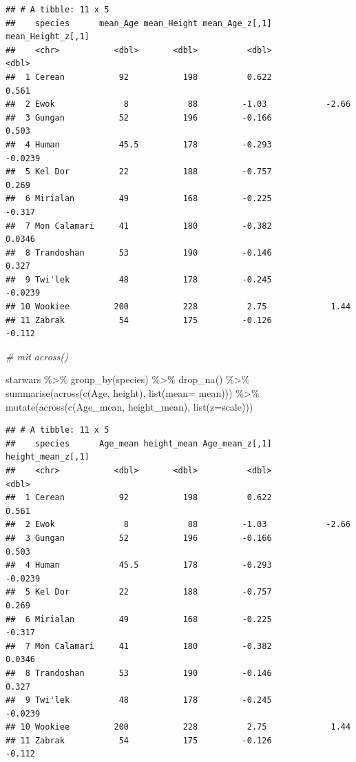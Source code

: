 \documentclass[
]{book}
\newenvironment{Shaded}{\begin{snugshade}}{\end{snugshade}}
\newcommand{\AttributeTok}[1]{\textcolor[rgb]{0.77,0.63,0.00}{#1}}
\newcommand{\CommentTok}[1]{\textcolor[rgb]{0.56,0.35,0.01}{\textit{#1}}}
\newcommand{\FunctionTok}[1]{\textcolor[rgb]{0.00,0.00,0.00}{#1}}
\newcommand{\NormalTok}[1]{#1}
\newcommand{\SpecialCharTok}[1]{\textcolor[rgb]{0.00,0.00,0.00}{#1}}
\theoremstyle{definition}
\theoremstyle{definition}
\theoremstyle{definition}
\theoremstyle{definition}
\theoremstyle{remark}
\begin{document}
\begin{verbatim}
## # A tibble: 11 x 5
##    species      mean_Age mean_Height mean_Age_z[,1] mean_Height_z[,1]
##    <chr>           <dbl>       <dbl>          <dbl>             <dbl>
##  1 Cerean           92           198          0.622            0.561 
##  2 Ewok              8            88         -1.03            -2.66  
##  3 Gungan           52           196         -0.166            0.503 
##  4 Human            45.5         178         -0.293           -0.0239
##  5 Kel Dor          22           188         -0.757            0.269 
##  6 Mirialan         49           168         -0.225           -0.317 
##  7 Mon Calamari     41           180         -0.382            0.0346
##  8 Trandoshan       53           190         -0.146            0.327 
##  9 Twi'lek          48           178         -0.245           -0.0239
## 10 Wookiee         200           228          2.75             1.44  
## 11 Zabrak           54           175         -0.126           -0.112
\end{verbatim}

\begin{Shaded}
\begin{Highlighting}[]
\CommentTok{\# mit across()}

\NormalTok{starwars }\SpecialCharTok{\%\textgreater{}\%} \FunctionTok{group\_by}\NormalTok{(species) }\SpecialCharTok{\%\textgreater{}\%}
  \FunctionTok{drop\_na}\NormalTok{() }\SpecialCharTok{\%\textgreater{}\%}
  \FunctionTok{summarise}\NormalTok{(}\FunctionTok{across}\NormalTok{(}\FunctionTok{c}\NormalTok{(Age, height), }\FunctionTok{list}\NormalTok{(}\AttributeTok{mean=}\NormalTok{ mean))) }\SpecialCharTok{\%\textgreater{}\%}
           \FunctionTok{mutate}\NormalTok{(}\FunctionTok{across}\NormalTok{(}\FunctionTok{c}\NormalTok{(Age\_mean, height\_mean), }\FunctionTok{list}\NormalTok{(}\AttributeTok{z=}\NormalTok{scale)))}
\end{Highlighting}
\end{Shaded}

\begin{verbatim}
## # A tibble: 11 x 5
##    species      Age_mean height_mean Age_mean_z[,1] height_mean_z[,1]
##    <chr>           <dbl>       <dbl>          <dbl>             <dbl>
##  1 Cerean           92           198          0.622            0.561 
##  2 Ewok              8            88         -1.03            -2.66  
##  3 Gungan           52           196         -0.166            0.503 
##  4 Human            45.5         178         -0.293           -0.0239
##  5 Kel Dor          22           188         -0.757            0.269 
##  6 Mirialan         49           168         -0.225           -0.317 
##  7 Mon Calamari     41           180         -0.382            0.0346
##  8 Trandoshan       53           190         -0.146            0.327 
##  9 Twi'lek          48           178         -0.245           -0.0239
## 10 Wookiee         200           228          2.75             1.44  
## 11 Zabrak           54           175         -0.126           -0.112
\end{verbatim}
\end{document}
